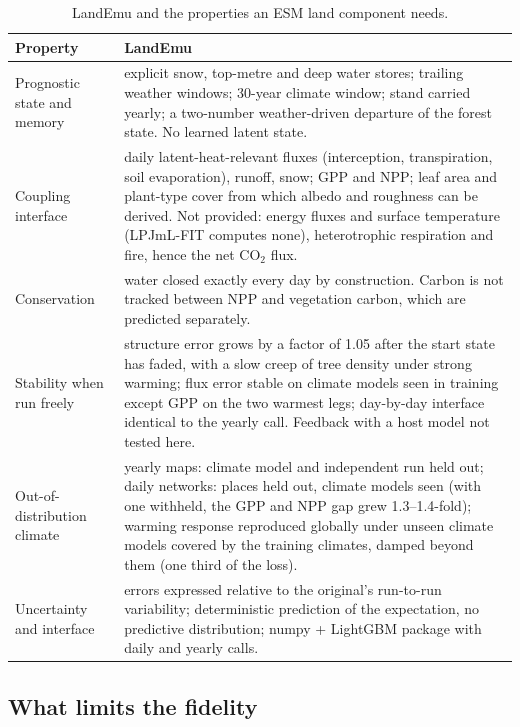 \documentclass[11pt,a4paper]{article}
\begin{document}
\begin{table}[!tbp]
\centering
\caption{LandEmu and the properties an ESM land component needs.}\label{tab:req}
\small
\begin{tabularx}{\textwidth}{@{}p{3.3cm}X@{}}
\toprule
\textbf{Property} & \textbf{LandEmu} \\
\midrule
Prognostic state and memory & explicit snow, top-metre and deep water stores; trailing weather windows; 30-year
climate window; stand carried yearly; a two-number weather-driven departure of the forest state. No learned latent
state. \\
Coupling interface & daily latent-heat-relevant fluxes (interception, transpiration, soil evaporation), runoff, snow;
GPP and NPP; leaf area and plant-type cover from which albedo and roughness can be derived. Not provided: energy fluxes
and surface temperature (LPJmL-FIT computes none), heterotrophic respiration and fire, hence the net CO$_2$ flux. \\
Conservation & water closed exactly every day by construction. Carbon is not tracked between NPP and vegetation carbon,
which are predicted separately. \\
Stability when run freely & structure error grows by a factor of 1.05 after the start state has faded, with a slow
creep of tree density under strong warming; flux error stable on climate models seen in training except GPP on the two
warmest legs; day-by-day interface identical to the yearly call. Feedback with a host model not tested here. \\
Out-of-distribution climate & yearly maps: climate model and independent run held out; daily networks: places held
out, climate models seen (with one withheld, the GPP and NPP gap grew 1.3--1.4-fold); warming response reproduced
globally under unseen climate models covered by the training climates, damped beyond them (one third of the loss). \\
Uncertainty and interface & errors expressed relative to the original's run-to-run variability; deterministic
prediction of the expectation, no predictive distribution; numpy + LightGBM package with daily and yearly calls. \\
\bottomrule
\end{tabularx}
\end{table}

\subsection{What limits the fidelity}
\end{document}
